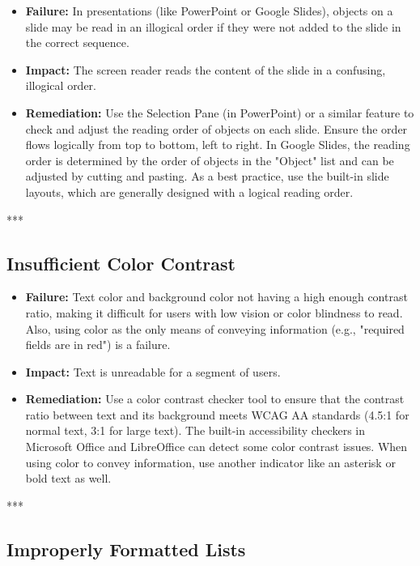 \begin{itemize}
	\item \textbf{Failure:} In presentations (like PowerPoint or Google Slides), objects on a slide may be read in an illogical order if they were not added to the slide in the correct sequence.
	\item \textbf{Impact:} The screen reader reads the content of the slide in a confusing, illogical order.
	\item \textbf{Remediation:} Use the Selection Pane (in PowerPoint) or a similar feature to check and adjust the reading order of objects on each slide. Ensure the order flows logically from top to bottom, left to right. In Google Slides, the reading order is determined by the order of objects in the "Object" list and can be adjusted by cutting and pasting. As a best practice, use the built-in slide layouts, which are generally designed with a logical reading order.
\end{itemize}

***

\subsection{Insufficient Color Contrast}
\label{sub:insufficient-color-contrast}

\begin{itemize}
	\item \textbf{Failure:} Text color and background color not having a high enough contrast ratio, making it difficult for users with low vision or color blindness to read. Also, using color as the only means of conveying information (e.g., "required fields are in red") is a failure.
	\item \textbf{Impact:} Text is unreadable for a segment of users.
	\item \textbf{Remediation:} Use a color contrast checker tool to ensure that the contrast ratio between text and its background meets \gls{WCAG} AA standards (4.5:1 for normal text, 3:1 for large text). The built-in accessibility checkers in Microsoft Office and LibreOffice can detect some color contrast issues. When using color to convey information, use another indicator like an asterisk or bold text as well.
\end{itemize}

***

\subsection{Improperly Formatted Lists}
\label{sub:improperly-formatted-lists}

